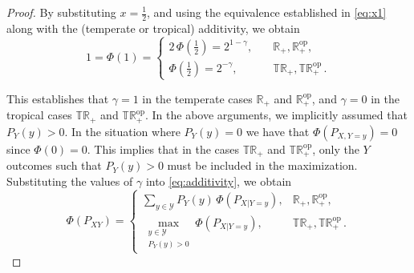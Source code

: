 \documentclass[aps,pra,11pt,onecolumn,nofootinbib,tightenlines]{revtex4-2}
\theoremstyle{definition}
\newcommand{\Y}{\mathcal{Y}}
\begin{document}
\begin{proof}
By substituting $x = \frac{1}{2}$, and using the equivalence established in \eqref{eq:x1} along with the (temperate or tropical) additivity, we obtain
\begin{equation}
1 = \Phi(1) =
\begin{cases}
2\,\Phi\!\left(\tfrac{1}{2}\right) = 2^{1-\gamma}, & \quad \mathbb{R}_+,\mathbb{R}_+^{\mathrm{op}}, \\
\Phi\!\left(\tfrac{1}{2}\right) = 2^{-\gamma}, & \quad \mathbb{TR}_+,\mathbb{TR}_+^{\mathrm{op}} \,.
\end{cases}
\end{equation}

This establishes that $\gamma = 1$ in the temperate cases $\mathbb{R}_+$ and $\mathbb{R}^{\mathrm{op}}_+$, and $\gamma = 0$ in the tropical cases $\mathbb{TR}_+$ and $\mathbb{TR}^{\mathrm{op}}_+$. In the above arguments, we implicitly assumed that $P_{Y}(y)>0$. In the situation where $P_Y(y)=0$ we have that $\Phi(P_{X,Y=y}) =0$ since $\Phi(0)=0$. This implies that in the cases $\mathbb{TR}_+$ and $\mathbb{TR}^{\mathrm{op}}_+$, only the $Y$ outcomes such that $P_Y(y)>0$ must be included in the maximization. Substituting the values of $\gamma$ into \eqref{eq:additivity}, we obtain
\begin{equation}\label{eq:general1}
\Phi(P_{XY}) =
\begin{cases}
\sum_{y \in \Y} P_Y(y)\,\Phi\!\left(P_{X|Y=y}\right), & \mathbb{R}_+,\mathbb{R}_+^{\mathrm{op}}, \\
\max \limits_{\substack{y \in \mathcal{Y} \\ P_Y( y) > 0}} \Phi\!\left(P_{X|Y=y}\right), & \mathbb{TR}_+,\mathbb{TR}_+^{\mathrm{op}} \,.
\end{cases}
\end{equation}

 \bigskip
 \bigskip


\end{proof}
\end{document}
